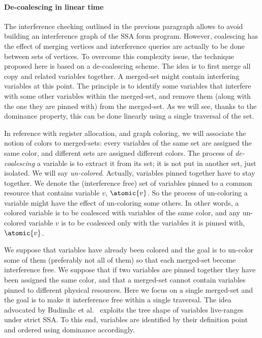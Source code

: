 \paragraph{De-coalescing in linear time}
The interference checking outlined in the previous paragraph allows to avoid building an interference graph of the SSA form program. However, coalescing has the effect of merging vertices and interference queries are actually to be done between sets of vertices. 
To overcome this complexity issue, the technique proposed here is based on a de-coalescing scheme.
The idea is to first merge all copy and \phifun related variables together. A merged-set might contain interfering variables at this point. The principle is to identify some variables that interfere with some other variables within the merged-set, and remove them (along with the one they are pinned with) from the merged-set. As we will see, thanks to the dominance property, this can be done linearly using a single traversal of the set.

In reference with register allocation, and graph coloring, we will associate the notion of colors to merged-sets: every variables of the same set are assigned the same color, and different sets are assigned different colors. The process of \emph{de-coalescing} a variable is to extract it from its set; it is not put in another set, just isolated. We will say \emph{un-colored}. Actually, variables pinned together have to stay together. We denote the (interference free) set of variables pinned to a common resource that contains variable $v$, $\atomic{v}$. So the process of un-coloring a variable might have the effect of un-coloring some others. In other words, a colored variable is to be coalesced with variables of the same color, and any un-colored variable $v$ is to be coalesced only with the variables it is pinned with, $\atomic{v}$. 


We suppose that variables have already been colored and the goal is to un-color some of them (preferably not all of them) so that each merged-set become interference free. We suppose that if two variables are pinned together they have been assigned the same color, and that a merged-set cannot contain variables pinned to different physical resources. Here we focus on a single merged-set and the goal is to make it interference free within a single traversal. The idea \ifhab advocated by Budimlic et al.~\cite{Budimlic02} \fi exploits the tree shape of variables live-ranges under strict SSA. To this end, variables are identified by their definition point and ordered using dominance accordingly. 

